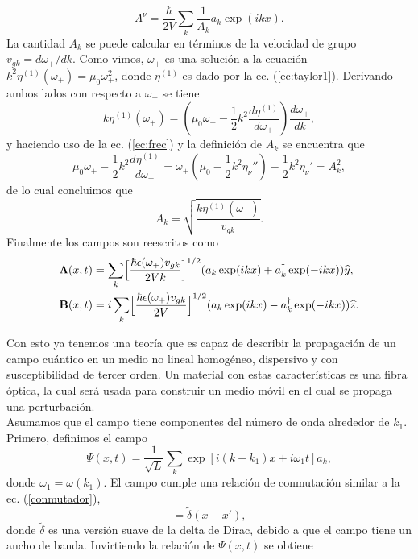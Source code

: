 \begin{equation}
\Lambda^{\nu}=\frac{\hbar}{2V}\sum_k\frac{1}{A_k}a_k\exp(ikx).
\end{equation}
La cantidad $A_k$ se puede calcular en t\'{e}rminos de la velocidad de grupo $v_{gk}=d\omega_+/dk$. Como vimos, $\omega_+$ es una soluci\'{o}n a la ecuaci\'{o}n $k^2\eta^{(1)}(\omega_+)=\mu_0\omega_+^2$, donde $\eta^{(1)}$ es dado por la ec. (\ref{ec:taylor1}). Derivando ambos lados con respecto a $\omega_+$ se tiene
\begin{equation}
k\eta^{(1)}(\omega_+)=\left(\mu_0\omega_+-\frac{1}{2}k^2\frac{d\eta^{(1)}}{d\omega_+}\right)\frac{d\omega_+}{dk},
\end{equation}
y haciendo uso de la ec. (\ref{ec:frec}) y la definici\'{o}n de $A_k$ se encuentra que
\begin{equation}
\mu_0\omega_+-\frac{1}{2}k^2\frac{d\eta^{(1)}}{d\omega_+}=\omega_+(\mu_0-\frac{1}{2}k^2\eta_{\nu}'')-\frac{1}{2}k^2\eta_{\nu}'=A_k^2,
\end{equation}
de lo cual concluimos que
\begin{equation}
A_k=\sqrt{\frac{k \eta^{(1)}(\omega_+)}{v_{gk}}}.
\end{equation}
Finalmente los campos son reescritos como
\begin{align}
 \mathbf{\Lambda}(x,t)&=\sum_k\Bigl[\frac{\hbar\epsilon(\omega_+)v_{gk}}{2Vk}\Bigr]^{1/2}(a_k \exp(ikx)+a^{\dagger}_k\exp(-ikx))\widehat{y},\\
\textbf{B}(x,t)&=i\sum_k\Bigl[\frac{\hbar\epsilon(\omega_+)v_{gk}}{2V}\Bigr]^{1/2}(a_k \exp(ikx)-a^{\dagger}_k\exp(-ikx))\widehat{z}.
\end{align}

Con esto ya tenemos una teoría que es capaz de describir la propagación de un campo cuántico en un medio no lineal homog\'{e}neo, dispersivo y con susceptibilidad de tercer orden. Un material con estas caracter\'{i}sticas es una fibra \'{o}ptica, la cual ser\'{a} usada para construir un medio m\'{o}vil en el cual se propaga una perturbaci\'{o}n.\\

Asumamos que el campo tiene componentes del número de onda alrededor de $k_1$. Primero, definimos el campo
\begin{equation}
\Psi(x,t)=\frac{1}{\sqrt{L}}\sum_k\exp[i(k-k_{1})x+i\omega_{1}t]a_k,
\end{equation}
donde $\omega_1=\omega(k_1)$. El campo cumple una relaci\'{o}n de conmutaci\'{o}n similar a la ec. (\ref{conmutador}), 
\begin{equation}
[\Psi(x,t),\Psi^{\dagger}(x',t)]=\widetilde{\delta}(x-x'),
\end{equation}
donde $\widetilde{\delta}$ es una versi\'{o}n suave de la delta de Dirac, debido a que el campo tiene un ancho de banda. Invirtiendo la relaci\'{o}n de $\Psi(x,t)$ se obtiene

